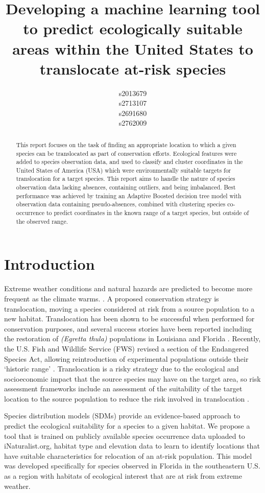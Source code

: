 \documentclass{article}
\title{Developing a machine learning tool to predict ecologically suitable areas within the United States to translocate at-risk species}
\author{
  s2013679\\
  \And
  s2713107\\
 \And
  s2691680\\
 \And
  s2762009
}
\begin{document}
\maketitle

\begin{abstract}
This report focuses on the task of finding an appropriate location to which a given species can be translocated as part of conservation efforts. Ecological features were added to species observation data, and used to classify and cluster coordinates in the United States of America (USA) which were environmentally suitable targets for translocation for a target species. This report aims to handle the nature of species observation data lacking absences, containing outliers, and being imbalanced. Best performance was achieved by training an Adaptive Boosted decision tree model with observation data containing pseudo-absences, combined with clustering species co-occurrence to predict coordinates in the known range of a target species, but outside of the observed range.\end{abstract}

\section{Introduction}
Extreme weather conditions and natural hazards are predicted to become more frequent as the climate warms. \cite{goncalves_global_2024}. A proposed conservation strategy is translocation, moving a species considered at risk from a source population to a new habitat. Translocation has been shown to be successful when performed for conservation purposes, and several success stories have been reported including the restoration of \textit{(Egretta thula)} populations in Louisiana and Florida \cite{spatz_tracking_2023}. Recently, the U.S. Fish and Wildlife Service (FWS) revised a section of the Endangered Species Act, allowing reintroduction of experimental populations outside their ‘historic range’ \cite{fws}. Translocation is a risky strategy due to the ecological and socioeconomic impact that the source species may have on the target area, so risk assessment frameworks include an assessment of the suitability of the target location to the source population to reduce the risk involved in translocation \cite{hoegh-guldberg_assisted_2008}.

Species distribution models (SDMs) provide an evidence-based approach to predict the ecological suitability for a species to a given habitat\cite{guisan_predicting_2013}. We propose a tool that is trained on publicly available species occurrence data uploaded to iNaturalist.org, habitat type and elevation data to learn to identify locations that have suitable characteristics for relocation of an at-risk population. This model was developed specifically for species observed in Florida in the southeastern U.S. as a region with habitats of ecological interest that are at risk from extreme weather.
\end{document}
